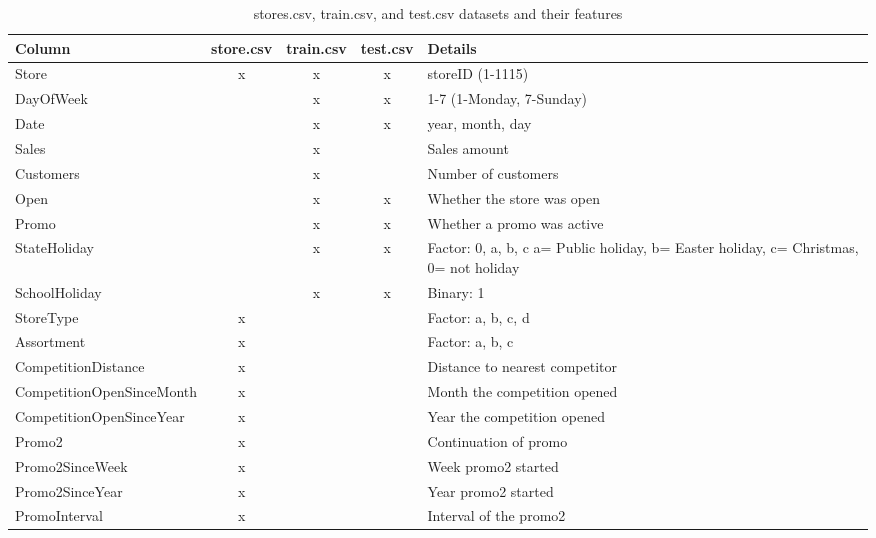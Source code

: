\documentclass{article}
\begin{document}


\begin{table}[H]
    \centering
    \begin{tabular}{|l|c|c|c|p{4cm}|}
        \hline
        \textbf{Column} & \textbf{store.csv} & \textbf{train.csv} & \textbf{test.csv} & \textbf{Details} \\
        \hline
        Store & x & x & x & storeID (1-1115) \\
        \hline
        DayOfWeek &  & x & x & 1-7 (1-Monday, 7-Sunday) \\
        \hline
        Date &  & x & x & year, month, day \\
        \hline
        Sales &  & x &  & Sales amount \\
        \hline
        Customers &  & x &  & Number of customers \\
        \hline
        Open &  & x & x & Whether the store was open \\
        \hline
        Promo &  & x & x & Whether a promo was active \\
        \hline
        StateHoliday &  & x & x & Factor: 0, a, b, c \newline a= Public holiday, b= Easter holiday, c= Christmas, 0= not holiday \\
        \hline
        SchoolHoliday &  & x & x & Binary: 1 \\
        \hline
        StoreType & x &  &  & Factor: a, b, c, d \\
        \hline
        Assortment & x &  &  & Factor: a, b, c \\
        \hline
        CompetitionDistance & x &  &  & Distance to nearest competitor \\
        \hline
        CompetitionOpenSinceMonth & x &  &  & Month the competition opened \\
        \hline
        CompetitionOpenSinceYear & x &  &  & Year the competition opened \\
        \hline
        Promo2 & x &  &  & Continuation of promo \\
        \hline
        Promo2SinceWeek & x &  &  & Week promo2 started \\
        \hline
        Promo2SinceYear & x &  &  & Year promo2 started \\
        \hline
        PromoInterval & x &  &  & Interval of the promo2 \\
        \hline
    \end{tabular}
    \caption{stores.csv, train.csv, and test.csv datasets and their features}
    \label{tab:features}
\end{table}
\end{document}
